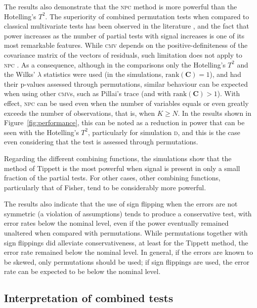 The results also demonstrate that the \textsc{npc} method is more powerful than the Hotelling's $T^2$. The superiority of combined permutation tests when compared to classical multivariate tests has been observed in the literature \citep{Blair1994}, and the fact that power increases as the number of partial tests with signal increases is one of its most remarkable features. While \textsc{cmv} depends on the positive-definiteness of the covariance matrix of the vectors of residuals, such limitation does not apply to \textsc{npc} \citep{Pesarin2010_finite}. As a consequence, although in the comparisons only the Hotelling's $T^2$ and the Wilks' $\lambda$ statistics were used (in the simulations, $\mathrm{rank}\left(\mathbf{C}\right) = 1$), and had their p-values assessed through permutations, similar behaviour can be expected when using other \textsc{cmv}s, such as Pillai's trace (and with $\mathrm{rank}\left(\mathbf{C}\right) > 1$). With effect, \textsc{npc} can be used even when the number of variables equals or even greatly exceeds the number of observations, that is, when $K \geqslant N$. In the results shown in Figure~\ref{fig:performance}, this can be noted as a reduction in power that can be seen with the Hotelling's $T^2$, particularly for simulation \textsc{d}, and this is the case even considering that the test is assessed through permutations.

Regarding the different combining functions, the simulations show that the method of Tippett is the most powerful when signal is present in only a small fraction of the partial tests. For other cases, other combining functions, particularly that of Fisher, tend to be considerably more powerful.

The results also indicate that the use of sign flipping when the errors are not symmetric (a violation of assumptions) tends to produce a conservative test, with error rates below the nominal level, even if the power eventually remained unaltered when compared with permutations. While permutations together with sign flippings did alleviate conservativeness, at least for the Tippett method, the error rate remained below the nominal level. In general, if the errors are known to be skewed, only permutations should be used; if sign flippings are used, the error rate can be expected to be below the nominal level.

\subsection{Interpretation of combined tests}

